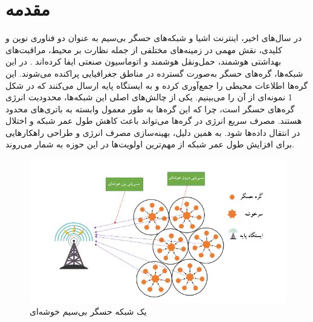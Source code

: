 \documentclass[11.5pt,onecolumn,a4paper]{article}
\begin{document}
	\section{مقدمه}
	\hspace*{1em}در سال‌های اخیر، اینترنت اشیا  و شبکه‌های حسگر بی‌سیم به عنوان دو فناوری نوین و کلیدی، نقش مهمی در زمینه‌های مختلفی از جمله نظارت بر محیط، مراقبت‌های بهداشتی هوشمند، حمل‌ونقل هوشمند و اتوماسیون صنعتی ایفا کرده‌اند \cite{ref1, ref2, ref3}. در این شبکه‌ها، گره‌های حسگر به‌صورت گسترده در مناطق جغرافیایی پراکنده می‌شوند. این گره‌ها اطلاعات محیطی را جمع‌آوری کرده و به ایستگاه‌ پایه ارسال می‌کنند که در شکل 1 نمونه‌ای از آن را می‌بینیم.  یکی از چالش‌های اصلی این شبکه‌ها، محدودیت انرژی گره‌های حسگر است، چرا که این گره‌ها به طور معمول وابسته به باتری‌های محدود هستند. مصرف سریع انرژی در گره‌ها می‌تواند باعث کاهش طول عمر شبکه و اختلال در انتقال داده‌ها شود. به همین دلیل، بهینه‌سازی مصرف انرژی و طراحی راهکارهایی برای افزایش طول عمر شبکه از مهم‌ترین اولویت‌ها در این حوزه به‌ شمار می‌روند.
	\begin{figure}[h] %
		\centering %
		\includegraphics[width=\textwidth]{cluster-persian.png} %
		\caption{یک شبکه حسگر بی‌سیم خوشه‌ای} %
		\label{fig:your_label} %
	\end{figure}
	
\end{document}
